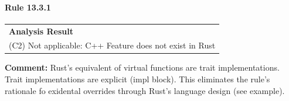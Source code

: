\paragraph{Rule 13.3.1}
\begin{longtable}{p{13cm}}
\textbf{Analysis Result} \\
(C2) Not applicable: C++ Feature does not exist in Rust \\
\end{longtable}
\textbf{Comment:} Rust's equivalent of virtual functions are trait implementations. Trait implementations are explicit (impl block). This eliminates the rule's rationale fo exidental overrides through Rust's language design (see example). \\



